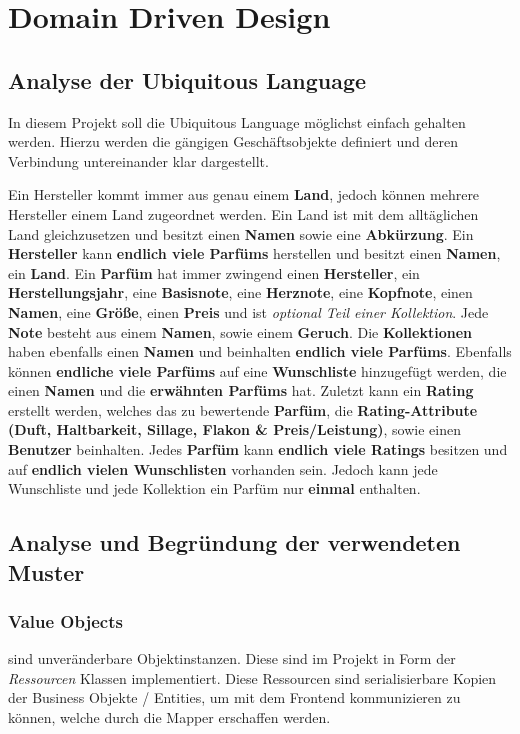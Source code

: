 \chapter{Domain Driven Design}

	\section{Analyse der Ubiquitous Language}
	In diesem Projekt soll die Ubiquitous Language möglichst einfach gehalten werden. Hierzu werden die gängigen Geschäftsobjekte definiert und deren Verbindung untereinander klar dargestellt.
	
	\par Ein Hersteller kommt immer aus genau einem \textbf{Land}, jedoch können mehrere Hersteller einem Land zugeordnet werden. Ein Land ist mit dem alltäglichen Land gleichzusetzen und besitzt einen \textbf{Namen} sowie eine \textbf{Abkürzung}. Ein \textbf{Hersteller} kann \textbf{endlich viele Parfüms} herstellen und besitzt einen \textbf{Namen}, ein \textbf{Land}. Ein \textbf{Parfüm} hat immer zwingend einen \textbf{Hersteller}, ein \textbf{Herstellungsjahr}, eine \textbf{Basisnote}, eine \textbf{Herznote}, eine \textbf{Kopfnote}, einen \textbf{Namen}, eine \textbf{Größe}, einen \textbf{Preis} und ist \textit{optional Teil einer Kollektion}. Jede \textbf{Note} besteht aus einem \textbf{Namen}, sowie einem \textbf{Geruch}. Die \textbf{Kollektionen} haben ebenfalls einen \textbf{Namen} und beinhalten \textbf{endlich viele Parfüms}. Ebenfalls können \textbf{endliche viele Parfüms} auf eine \textbf{Wunschliste} hinzugefügt werden, die einen \textbf{Namen} und die \textbf{erwähnten Parfüms} hat. Zuletzt kann ein \textbf{Rating} erstellt werden, welches das zu bewertende \textbf{Parfüm}, die \textbf{Rating-Attribute (Duft, Haltbarkeit, Sillage, Flakon \& Preis/Leistung)}, sowie einen \textbf{Benutzer} beinhalten. Jedes \textbf{Parfüm} kann \textbf{endlich viele Ratings} besitzen und auf \textbf{endlich vielen Wunschlisten} vorhanden sein. Jedoch kann jede Wunschliste und jede Kollektion ein Parfüm nur \textbf{einmal} enthalten.
	
	\section{Analyse und Begründung der verwendeten Muster}
	
		\subsection{Value Objects}
		 sind unveränderbare Objektinstanzen. Diese sind im Projekt in Form der \textit{Ressourcen} Klassen implementiert. Diese Ressourcen sind serialisierbare Kopien der Business Objekte / Entities, um mit dem Frontend kommunizieren zu können, welche durch die Mapper erschaffen werden.
	
